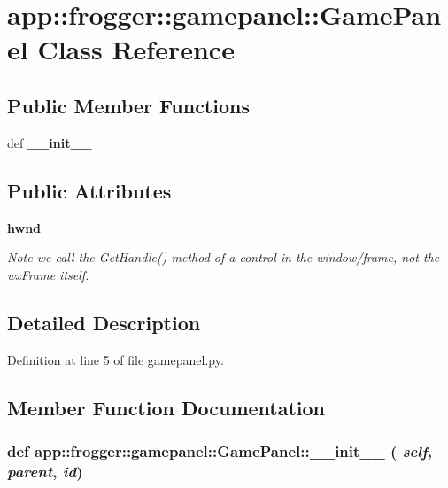 \section{app::frogger::gamepanel::GamePanel Class Reference}
\label{classapp_1_1frogger_1_1gamepanel_1_1GamePanel}
\subsection*{Public Member Functions}
\begin{CompactItemize}
\item 
def {\bf \_\-\_\-init\_\-\_\-}
\end{CompactItemize}
\subsection*{Public Attributes}
\begin{CompactItemize}
\item 
{\bf hwnd}
\begin{CompactList}\small\item\em Note we call the GetHandle() method of a control in the window/frame, not the wxFrame itself. \item\end{CompactList}\end{CompactItemize}


\subsection{Detailed Description}


Definition at line 5 of file gamepanel.py.

\subsection{Member Function Documentation}
\subsubsection{\setlength{\rightskip}{0pt plus 5cm}def app::frogger::gamepanel::GamePanel::\_\-\_\-init\_\-\_\- ( {\em self},  {\em parent},  {\em id})}\label{classapp_1_1frogger_1_1gamepanel_1_1GamePanel_eb033baa50becd676b1a015a83b3ae82}




